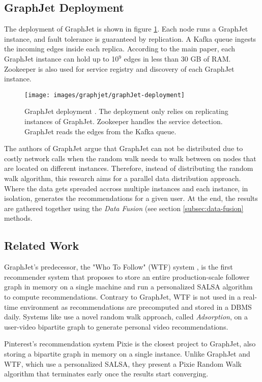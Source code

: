 \subsection{GraphJet Deployment}
\label{subsec:GraphJet-Deployment}
The deployment of GraphJet is shown in figure \ref{fig:graphJet-deployment}. Each node runs a GraphJet instance, and fault tolerance is guaranteed by replication. A Kafka queue ingests the incoming edges inside each replica. According to the main paper, each GraphJet instance can hold up to 10$^9$ edges in less than 30 GB of RAM. Zookeeper is also used for service registry and discovery of each GraphJet instance.
\begin{figure}[!htb]
    \centering
    \texttt{[image: images/graphjet/graphJet-deployment]}
    \caption{GraphJet deployment \cite{sharmaGraphJetRealtimeContent2016}. The deployment only relies on replicating instances of GraphJet. Zookeeper handles the service detection. GraphJet reads the edges from the Kafka queue.}
    \label{fig:graphJet-deployment}
\end{figure}

The authors of GraphJet argue that GraphJet can not be distributed due to costly network calls when the random walk needs to walk between on nodes that are located on different instances. Therefore, instead of distributing the random walk algorithm, this research aims for a parallel data distribution approach. Where the data gets spreaded accross multiple instances and each instance, in isolation, generates the recommendations for a given user. At the end, the results are gathered together using the \emph{Data Fusion} (see section \ref{subsec:data-fusion} methods.

\subsection{Related Work}
\label{subsec:graphjet-related-work}
GraphJet's predecessor, the "Who To Follow" (WTF) system \cite{guptaWTFWhoFollow2013}, is the first recommender system that proposes to store an entire production-scale follower graph in memory on a single machine and run a personalized SALSA algorithm to compute recommendations. Contrary to GraphJet, WTF is not used in a real-time environment as recommendations are precomputed and stored in a DBMS daily. Systems like \cite{balujaVideoSuggestionDiscovery2008} use a novel random walk approach, called \emph{Adsorption}, on a user-video bipartite graph to generate personal video recommendations.


Pinterest's recommendation system Pixie \cite{eksombatchaiPixieSystemRecommending2018} is the closest project to GraphJet, also storing a bipartite graph in memory on a single instance. Unlike GraphJet and WTF, which use a personalized SALSA, they present a Pixie Random Walk algorithm that terminates early once the results start converging.
